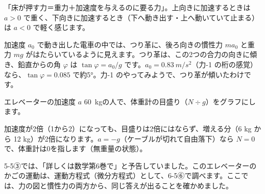 \begin{phyomi}[$N=m(g+a)$]
「床が押す力＝重力＋加速度を与えるのに要る力」。上向きに加速するときは $a>0$ で重く、下向きに加速するとき（下へ動き出す・上へ動いていて止まる）は $a<0$ で軽く感じます。
\end{phyomi}
\begin{phmijika}[電車のつり革]
加速度 $a_0$ で動き出した電車の中では、つり革に、後ろ向きの慣性力 $ma_0$ と重力 $mg$ がはたらいているように見えます。つり革は、この2つの合力の向きに傾き、鉛直からの角 $\varphi$ は $\tan\varphi=a_0/g$ です。$a_0=\qty{0.83}{m/s^2}$（力-1 の桁の感覚）なら、$\tan\varphi=0.085$ で約5°。力-1 のやってみようで、つり革が傾いたわけです。
\end{phmijika}
\begin{lrbox}{\pxcplota}\end{lrbox}%
\begin{phbaisuru}{エレベーターの加速度 $a$}
\qty{60}{kg}の人で、体重計の目盛り（$N\div g$）をグラフにします。
\begin{bkcenter}
\usebox{\pxcplota}
\end{bkcenter}
加速度が2倍（1から2）になっても、目盛りは2倍にはならず、増える分（6 kg から 12 kg）が2倍になります。$a=-g$（ケーブルが切れて自由落下）なら $N=0$ で、体重計は0を指します（無重量の状態）。
\end{phbaisuru}

\mbox{5-5③}では、「詳しくは数学第6巻で」と予告していました。このエレベーターのかごの運動は、運動方程式（微分方程式）として、6-5⑥で調べます。ここでは、力の図と慣性力の両方から、同じ答えが出ることを確かめました。

\begin{phflow}[加速する乗り物]
\end{phflow}

